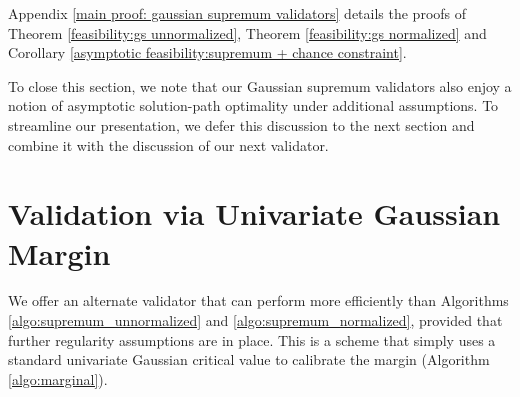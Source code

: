 \documentclass[mnsc,blindrev]{informs4} %
\begin{document}
Appendix \ref{main proof: gaussian supremum validators} details the proofs of Theorem \ref{feasibility:gs unnormalized}, Theorem \ref{feasibility:gs normalized} and Corollary \ref{asymptotic feasibility:supremum + chance constraint}.

To close this section, we note that our Gaussian supremum validators also enjoy a notion of asymptotic solution-path optimality under additional assumptions. To streamline our presentation, we defer this discussion to the next section and combine it with the discussion of our next validator.


\section{Validation via Univariate Gaussian Margin}\label{sec:standard gaussian margin}

We offer an alternate validator that can perform more efficiently than Algorithms \ref{algo:supremum_unnormalized} and \ref{algo:supremum_normalized}, provided that further regularity assumptions are in place. This is a scheme that simply uses a standard univariate Gaussian critical value to calibrate the margin (Algorithm \ref{algo:marginal}).
\end{document}
